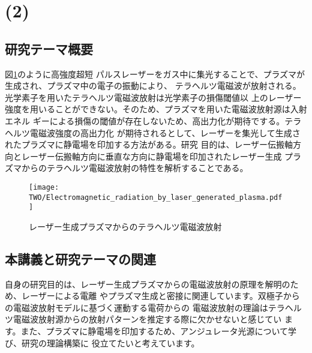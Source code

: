 
\section{(2)}
  \subsection{研究テーマ概要}
    図\ref{Electromagnetic_radiation_b_laser_generated_plasmay}のように高強度超短
    パルスレーザーをガス中に集光することで、プラズマが生成され、プラズマ中の電子の振動により、
    テラヘルツ電磁波が放射される。光学素子を用いたテラヘルツ電磁波放射は光学素子の損傷閾値以
    上のレーザー強度を用いることができない。そのため、プラズマを用いた電磁波放射源は入射エネル
    ギーによる損傷の閾値が存在しないため、高出力化が期待でする。テラヘルツ電磁波強度の高出力化
    が期待されるとして、レーザーを集光して生成されたプラズマに静電場を印加する方法がある。研究
    目的は、レーザー伝搬軸方向とレーザー伝搬軸方向に垂直な方向に静電場を印加されたレーザー生成
    プラズマからのテラヘルツ電磁波放射の特性を解析することである。
    \begin{figure}[H]
      \centering
      \texttt{[image: 
        \\TWO/Electromagnetic\_radiation\_by\_laser\_generated\_plasma.pdf
      ]}
      \caption{レーザー生成プラズマからのテラヘルツ電磁波放射}
      \label{Electromagnetic_radiation_b_laser_generated_plasmay}
    \end{figure}

  \subsection{本講義と研究テーマの関連}
    自身の研究目的は、レーザー生成プラズマからの電磁波放射の原理を解明のため、レーザーによる電離
    やプラズマ生成と密接に関連しています。双極子からの電磁波放射モデルに基づく運動する電荷からの
    電磁波放射の理論はテラヘルツ電磁波放射源からの放射パターンを推定する際に欠かせないと感じてい
    ます。また、プラズマに静電場を印加するため、アンジュレータ光源について学び、研究の理論構築に
    役立てたいと考えています。
